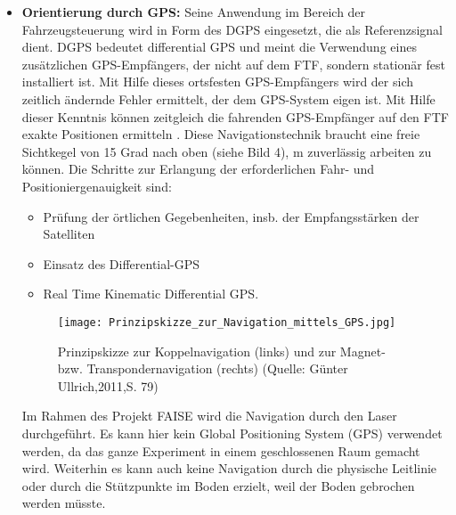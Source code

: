 \begin{itemize}
	\item \textbf{Orientierung durch GPS:} Seine Anwendung im Bereich der Fahrzeugsteuerung wird in Form des DGPS eingesetzt, die als Referenzsignal dient. DGPS bedeutet differential GPS und meint die Verwendung eines zus\"atzlichen GPS-Empf\"angers, der nicht auf dem FTF, sondern station\"ar fest installiert ist. Mit Hilfe dieses ortsfesten GPS-Empf\"angers wird der sich zeitlich \"andernde Fehler ermittelt, der dem GPS-System eigen ist. Mit Hilfe dieser Kenntnis k\"onnen zeitgleich die fahrenden GPS-Empf\"anger auf den FTF exakte Positionen ermitteln \cite[S. 27]{Guenther:2011}. Diese Navigationstechnik braucht eine freie Sichtkegel von 15 Grad  nach oben (siehe Bild 4), m zuverl\"assig arbeiten zu k\"onnen. Die Schritte zur Erlangung der erforderlichen Fahr- und Positioniergenauigkeit sind:
	\begin{itemize}
		\item Pr\"ufung der \"ortlichen Gegebenheiten, insb. der Empfangsst\"arken der Satelliten
 \item Einsatz des Differential-GPS
 \item Real Time Kinematic Differential GPS. 
\end{itemize}
	\begin{figure}[h!]
		\centering
		\texttt{[image: Prinzipskizze\_zur\_Navigation\_mittels\_GPS.jpg]}
		\caption{Prinzipskizze zur Koppelnavigation (links) und zur Magnet- bzw. Transpondernavigation (rechts) (Quelle: G\"unter Ullrich,2011,S. 79)}
		\label{Systemarchitektur_FTS}
\end{figure}
Im Rahmen des Projekt FAISE wird die Navigation durch den Laser durchgef\"uhrt. Es kann hier kein Global Positioning System (GPS) verwendet werden, da das ganze Experiment in einem geschlossenen Raum gemacht wird. Weiterhin es kann auch keine Navigation durch die physische Leitlinie oder durch die St\"utzpunkte im Boden erzielt, weil der Boden gebrochen werden m\"usste.
\end{itemize}

